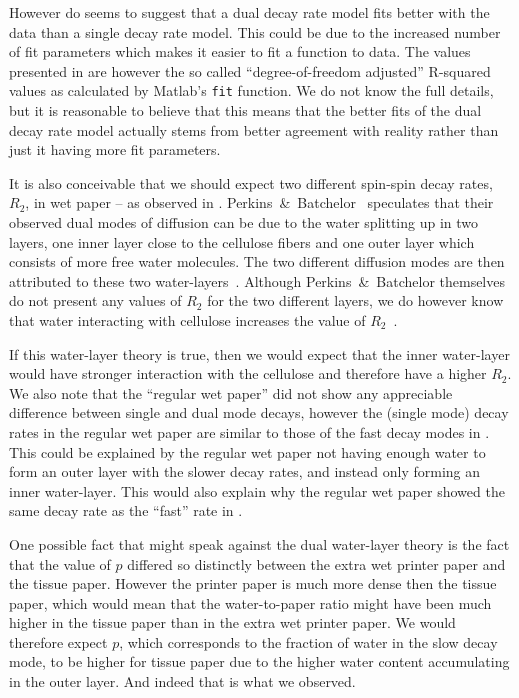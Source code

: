 \documentclass[11pt,a4paper, twocolumn,
swedish, english %
]{article}
\begin{document}
However  do seems to suggest that a dual
decay rate model fits better with the data than a single decay rate
model. This could be due to the increased number of fit parameters
which makes it easier to fit a function to data. The values presented
in  are however the so called
``degree-of-freedom adjusted'' R-squared values as calculated by
Matlab's \texttt{fit} function\footnotemark{}. We do not know the
full details, but it is reasonable to believe that this means that the
better fits of the dual decay rate model actually stems from better
agreement with reality rather than just it having more fit
parameters. 

It is also conceivable that we should expect two different spin-spin
decay rates, $R_2$, in wet paper -- as observed in
. Perkins~\&~Batchelor~\cite{Perkins-Batchelor2012}
speculates that their observed dual modes of diffusion can be due to
the water splitting up in two layers, one inner layer close to the
cellulose fibers and one outer layer which consists of more free water
molecules. 
The two different diffusion modes are then attributed to these two
water-layers~\cite{Perkins-Batchelor2012}. Although
Perkins~\&~Batchelor themselves do not present any values of $R_2$ for
the two different layers, we do however know that water interacting
with cellulose increases the value of $R_2$~\cite{Ono-etal2004}.

If this water-layer theory is true, then we would expect that the
inner water-layer would have stronger interaction with the cellulose
and therefore have a higher $R_2$. We also note that the ``regular wet
paper'' did not show any appreciable difference between single and
dual mode decays, however the (single mode) decay rates in the regular
wet paper are similar to those of the fast decay modes in
. This could be explained by the regular wet
paper not having enough water to form an outer layer with the slower
decay rates, and instead only forming an inner water-layer.
This would also explain why the regular wet paper showed the same
decay rate as the ``fast'' rate in .

One possible fact that might speak against the dual water-layer
theory is the fact that the value of $p$ differed so distinctly
between the extra wet printer paper and the tissue paper. However the
printer paper is much more dense then the tissue paper, which would
mean that the water-to-paper ratio might have been much higher in the
tissue paper than in the extra wet printer paper. We would therefore
expect $p$, which corresponds to the fraction of water in the slow
decay mode, to be higher for tissue paper due to the higher water
content accumulating in the outer layer. And indeed that is what we
observed. 
\end{document}
